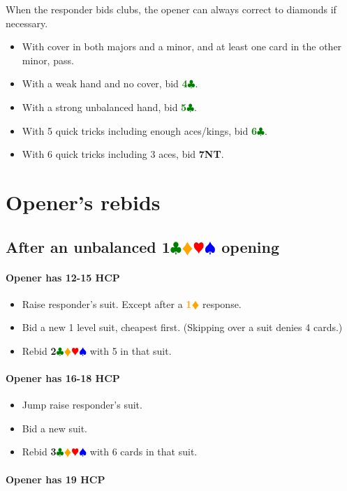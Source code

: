 \documentclass{article}
\newcommand{\Hs}{\textcolor{Red}{$\varheart$}}
\newcommand{\Ss}{\textcolor{Blue}{$\spadesuit$}}
\newcommand{\Ds}{\textcolor{Orange}{$\vardiamond$}}
\newcommand{\Cs}{\textcolor{Green}{$\clubsuit$}}
\newcommand{\NTs}{\textbf{\footnotesize{NT}}}
\newcommand{\D}[1]{\textcolor{Orange}{\textbf{#1}\Ds}}
\newcommand{\C}[1]{\textcolor{Green}{\textbf{#1}\Cs}}
\newcommand{\NT}[1]{\textbf{#1\NTs}}
\newcommand{\suits}[1]{\textbf{#1}\Cs\Ds\Hs\Ss}
\begin{document}
When the responder bids clubs, the opener can always correct to diamonds if necessary.
\begin{itemize}
\item With cover in both majors and a minor, and at least one card in the other minor, pass.
\item With a weak hand and no cover, bid \C{4}.
\item With a strong unbalanced hand, bid \C{5}.
\item With 5 quick tricks including enough aces/kings, bid \C{6}.
\item With 6 quick tricks including 3 aces, bid \NT{7}.
\end{itemize}

\section{Opener's rebids}

\subsection{After an unbalanced \suits{1} opening}

\paragraph{Opener has 12-15 HCP}

\begin{itemize}
\item Raise responder's suit. Except after a \D{1} response.
\item Bid a new 1 level suit, cheapest first. (Skipping over a suit denies 4 cards.)
\item Rebid \suits{2} with 5 in that suit.
\end{itemize}

\paragraph{Opener has 16-18 HCP}

\begin{itemize}
\item Jump raise responder's suit.
\item Bid a new suit.
\item Rebid \suits{3} with 6 cards in that suit.
\end{itemize}

\paragraph{Opener has 19 HCP}
\end{document}
